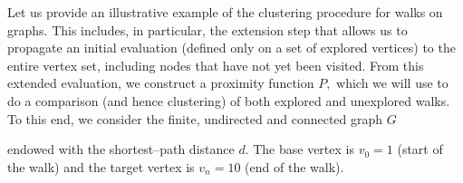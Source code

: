 \documentclass[preprint,12pt]{elsarticle}
\begin{document}
Let us provide an illustrative example of the clustering procedure for walks on graphs. This includes, in particular, the extension step that allows us to propagate an initial evaluation (defined only on a set of explored vertices) to the entire vertex set, including nodes that have not yet been visited. From this extended evaluation, we construct a proximity function $P,$ which we will use to do a comparison (and hence clustering) of both explored and unexplored walks.
To this end, we consider the finite, undirected and connected graph $G$
\begin{center}
\end{center}
endowed with the shortest–path distance $d$.
The base vertex is $v_0=1$ (start of the walk) and the target vertex is $v_n=10$ (end of the walk).
\end{document}
